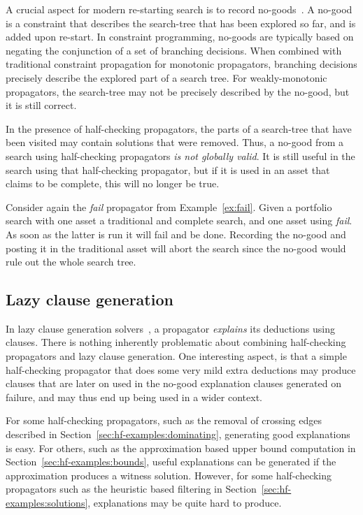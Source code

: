 \documentclass[runningheads]{llncs}
\begin{document}
A crucial aspect for modern re-starting search is to record
no-goods~\cite{Katsirelos05,Lee16}. A no-good is a constraint that
describes the search-tree that has been explored so far, and is added
upon re-start. In constraint programming, no-goods are typically based
on negating the conjunction of a set of branching decisions. When combined with traditional
constraint propagation for monotonic propagators, branching decisions
precisely describe the explored part of a search tree. For
weakly-monotonic propagators, the search-tree may not be precisely
described by the no-good, but it is still correct. 

In the presence of half-checking propagators, the parts of a
search-tree that have been visited may contain solutions that were
removed. Thus, a no-good from a
search using half-checking propagators \emph{is not globally valid}. It is
still useful in the search using that half-checking propagator, but if
it is used in an asset that claims to be complete, this will no
longer be true.

Consider again the \emph{fail} propagator from
Example~\ref{ex:fail}. Given a portfolio search with one asset a traditional
and complete search, and one asset using \emph{fail}. As soon as the
latter is run it will fail and be done. Recording the no-good and
posting it in the traditional asset will abort the search since the no-good
would rule out the whole search tree.

\subsection{Lazy clause generation}
\label{sec:lazy}

In lazy clause generation solvers~\cite{lcg}, a
propagator \emph{explains} its deductions using clauses. There is
nothing inherently problematic about combining half-checking
propagators and lazy clause generation. One interesting aspect, is
that a simple half-checking propagator that does some very mild extra
deductions may produce clauses that are later on used in the
no-good explanation clauses generated on failure, and may thus end up
being used in a wider context.

For some half-checking propagators, such as the removal of crossing
edges described in Section~\ref{sec:hf-examples:dominating},
generating good explanations is easy. For others, such as the
approximation based upper bound computation in
Section~\ref{sec:hf-examples:bounds}, useful explanations can be
generated if the approximation produces a witness solution. However,
for some half-checking propagators such as the heuristic based filtering in
Section~\ref{sec:hf-examples:solutions}, explanations may be quite
hard to produce.
\end{document}
